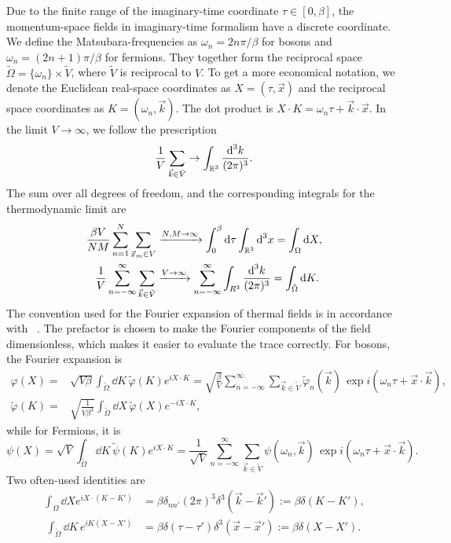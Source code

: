 Due to the finite range of the imaginary-time coordinate $\tau \in [0, \beta]$, the momentum-space fields in imaginary-time formalism have a discrete coordinate. 
We define the Matsubara-frequencies as $\omega_n = 2 n \pi / \beta$ for bosons and $\omega_n = (2n + 1) \pi / \beta$ for fermions.
They together form the reciprocal space $\tilde \Omega = \{\omega_n\}\times \tilde V$, where $\tilde V$ is reciprocal to $V$.
To get a more economical notation, we denote the Euclidean real-space coordinates as $X = (\tau, \vec x)$ and the reciprocal space coordinates as $K = (\omega_n, \vec k)$.
The dot product is $X\cdot K = \omega_n \tau + \vec k \cdot \vec x$.
In the limit $V\rightarrow \infty$, we follow the prescription
%
\begin{equation*}
    \frac{1}{V} \sum_{\vec k \in \tilde V} \rightarrow \int_{\mathbb{R}^3} 
    \frac{\text{d}^3 k}{(2 \pi)^3}.
\end{equation*}
The sum over all degrees of freedom, and the corresponding integrals for the thermodynamic limit are
%
\begin{align*}
     \frac{\beta V}{NM}\sum_{n=1}^N \sum_{\vec x_m \in V} 
    & \xrightarrow{N,M\rightarrow \infty} \int_{0}^\beta \text{d} \tau \int_{\mathbb{R}^3} \text{d}^3 x
    = \int_\Omega \text{d} X, \\
     \frac{1}{V} \sum_{n=-\infty}^\infty \sum_{\vec k \in \tilde V}
    & \xrightarrow{V \rightarrow \infty} \sum_{n=-\infty}^\infty \int_{R^3} \frac{\text{d}^3 k}{(2 \pi)^3}
    = \int_{\tilde \Omega} \text{d} K.
\end{align*}
%
The convention used for the Fourier expansion of thermal fields is in accordance with ~\autocite{kapustaFiniteTemperatureFieldTheory2006}. 
The prefactor is chosen to make the Fourier components of the field dimensionless, which makes it easier to evaluate the trace correctly.
For bosons, the Fourier expansion is
%
\begin{align*}
    \varphi(X)
    = &
    \sqrt{V \beta} \int_{\tilde \Omega} \dd K \,  \tilde \varphi(K) e^{i X\cdot K}
    =
    \sqrt{\frac{\beta}{V}} \sum_{n=-\infty}^\infty \sum_{\vec k \in \tilde V}
    \tilde \varphi_n(\vec k)\, \exp{i(\omega_n \tau + \vec x \cdot \vec k)}, \\
    \tilde \varphi(K)
    = &
    \sqrt{\frac{1}{V \beta^3}} \int_{\tilde \Omega} \dd X \,  \tilde \varphi(X) e^{ - i X\cdot K},
\end{align*}
%
while for Fermions, it is
%
\begin{equation}
    \psi(X) 
    = \sqrt{V} \int_{\tilde \Omega} \dd K \, \tilde \psi(K) e^{i X\cdot K} 
    = \frac{1}{\sqrt{V}} \sum_{n = - \infty}^\infty \sum_{\vec k \in \tilde V}
    \psi(\omega_n, \vec k) \, \exp{i(\omega_n \tau + \vec x \cdot \vec k)}.
\end{equation}
%
Two often-used identities are
%
\begin{align}
    \label{thermal delta}
    \int_{\Omega} \dd X e^{i X\cdot(K - K')} 
    & = \beta \delta_{nn'} (2 \pi)^3 \delta^3(\vec k - \vec k') := \beta \delta(K - K'), \\\
    \int_{\tilde \Omega} \dd K \, e^{i K(X - X')} 
    & = \beta \delta (\tau - \tau') \delta^3(\vec x - \vec x') 
    := \beta \delta(X - X').
\end{align}
%
